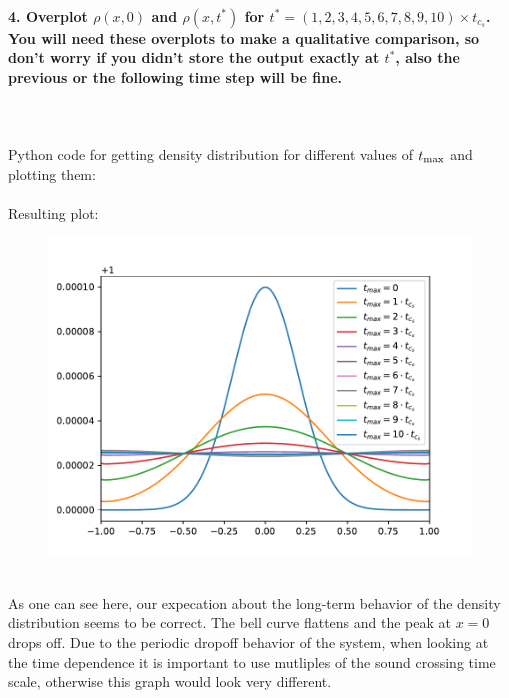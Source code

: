 \paragraph{4. Overplot 
    $\rho(x,0)$ and $\rho(x,t^{*})$ for 
    $t^{*}=(1,2,3,4,5,6,7,8,9,10)\times t_{c_s}$. You will 
    need these overplots to make a qualitative comparison, 
    so don’t worry if you didn’t store the output exactly 
    at $t^{*}$, also the previous or the following time 
    step will be fine.
} \ \\
    \\
    Python code for getting density distribution for 
    different values of $t_\textnormal{max}$ and 
    plotting them: \\
     \ \\
    Resulting plot:
    \begin{figure}[h!]
        \centering
        \includegraphics[width=.7\textwidth]{../figures/density_evolution.pdf}
    \end{figure} \ \\ 
    As one can see here, our expecation about the
    long-term behavior of the density distribution seems
    to be correct. The bell curve flattens and the 
    peak at $x=0$ drops off. Due to the periodic 
    dropoff behavior of the system, when looking at 
    the time dependence it is important to use mutliples 
    of the sound crossing time scale, otherwise this 
    graph would look very different.

\newpage
